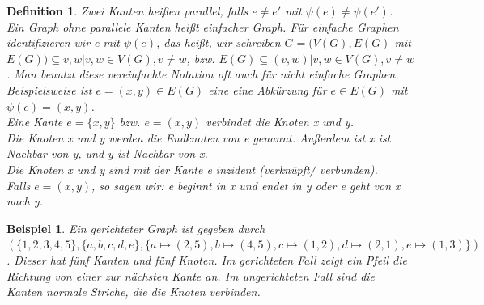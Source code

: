\documentclass{article}
\newtheorem{definition}[satz]{Definition}
\newtheorem{beispiel}[satz]{Beispiel}
\begin{document}
  \begin {definition} 
    Zwei Kanten heißen parallel, falls $e\neq e'$ mit $\psi(e) \neq \psi (e')$.\\
    Ein Graph ohne parallele Kanten heißt einfacher Graph.
    Für einfache Graphen identifizieren wir e mit $\psi (e)$, das heißt, wir schreiben $G= (V(G), E(G)$ mit $E(G)) \subseteq {{v,w}| v,w \in V(G), v\neq w}$, bzw. $E(G)\subseteq {(v,w)| v,w\in V(G), v\neq w}$.
    Man benutzt diese vereinfachte Notation oft auch für nicht einfache Graphen.\\
    Beispielsweise ist $e= (x,y) \in E(G)$ eine eine Abkürzung für $e\in  E(G)$ mit $\psi (e)=(x,y)$. \\
    Eine Kante $e=\{x,y\}$ bzw. $e= (x,y)$ verbindet die Knoten x und y.\\
    Die Knoten x und y werden die Endknoten von e genannt. Außerdem ist x ist Nachbar von y, und y ist Nachbar von x.\\
    Die Knoten x und y sind mit der Kante e inzident (verknüpft/ verbunden). \\
    Falls $e=(x,y)$, so sagen wir: e beginnt in x und endet in y oder e geht von x nach y.\\
  \end{definition}
  \vspace{\baselineskip}

  \begin{beispiel} 
    Ein gerichteter Graph ist gegeben durch $(\{1,2,3,4,5\}, \{a,b,c,d,e\}, \{a\mapsto  (2,5), b\mapsto (4,5), c\mapsto (1,2), d\mapsto (2,1), e\mapsto (1,3)\})$. 
    Dieser hat fünf Kanten und fünf Knoten.
    Im gerichteten Fall zeigt ein Pfeil die Richtung von einer zur nächsten Kante an.
    Im ungerichteten Fall sind die Kanten normale Striche, die die Knoten verbinden.
  \end{beispiel}
\end{document}
